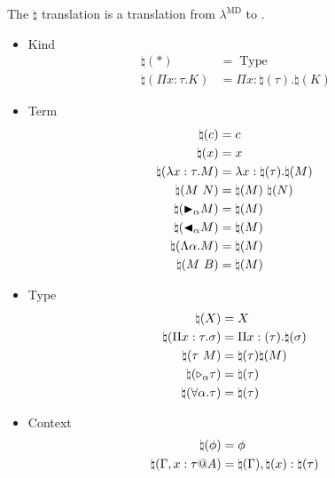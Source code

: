 \begin{dfn}
The $\natural$ translation is a translation from $\lambda^\text{MD}$ to .
    \begin{multicols}{2}
        \begin{itemize}
            \item Kind
                \begin{align*}
                    \natural(*) &= \operatorname{Type} & \\
                    \natural(\Pi x:\tau.K) &= \Pi x:\natural(\tau).\natural(K) &
                \end{align*}
            \item Term
                \begin{align*}
                    \natural(c) &= c & \\
                    \natural(x) &= x & \\
                    \natural(\lambda x:\tau.M) &= \lambda x:\natural(\tau).\natural(M) & \\
                    \natural(M\ N) &= \natural(M)\ \natural(N)& \\
                    \natural({\mathop{\blacktriangleright}}_\alpha M) &= \natural(M) & \\
                    \natural({\mathop{\blacktriangleleft}}_\alpha M) &= \natural(M)& \\
                    \natural(\Lambda\alpha.M) &= \natural(M)& \\
                    \natural(M\ B) &= \natural(M) &
                \end{align*}
            \item Type
            \begin{align*}
                \natural(X) &= X & \\
                \natural(\Pi x:\tau.\sigma) &= \Pi x:(\tau). \natural(\sigma) & \\
                \natural(\tau\ M) &= \natural(\tau) \natural(M) & \\
                \natural({\mathop{\triangleright}}_\alpha \tau) &= \natural(\tau) & \\
                \natural(\forall \alpha.\tau) &= \natural(\tau) &
            \end{align*}
        \item Context
            \begin{align*}
                \natural(\phi) &= \phi & \\
                \natural(\G, x:\tau@A) &= \natural(\G), \natural(x):\natural(\tau) & \\

\end{align*}
\end{itemize}
\end{multicols}
\end{dfn}
